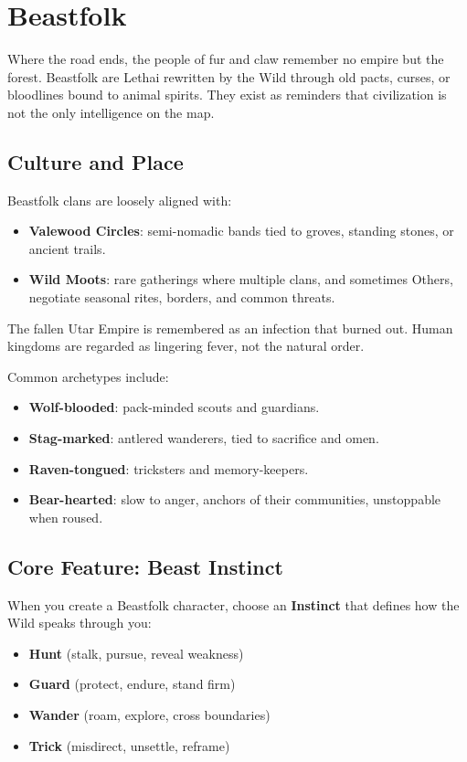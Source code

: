 \documentclass[11pt]{book}
\begin{document}
\section{Beastfolk}
\label{sec:beastfolk}

Where the road ends, the people of fur and claw remember no empire but the forest. Beastfolk are Lethai rewritten by the Wild through old pacts, curses, or bloodlines bound to animal spirits. They exist as reminders that civilization is not the only intelligence on the map.

\subsection{Culture and Place}
\label{subsec:beastfolk_culture}

Beastfolk clans are loosely aligned with:
\begin{itemize}
  \item \textbf{Valewood Circles}: semi-nomadic bands tied to groves, standing stones, or ancient trails.
  \item \textbf{Wild Moots}: rare gatherings where multiple clans, and sometimes Others, negotiate seasonal rites, borders, and common threats.
\end{itemize}

The fallen Utar Empire is remembered as an infection that burned out. Human kingdoms are regarded as lingering fever, not the natural order.

Common archetypes include:
\begin{itemize}
  \item \textbf{Wolf-blooded}: pack-minded scouts and guardians.
  \item \textbf{Stag-marked}: antlered wanderers, tied to sacrifice and omen.
  \item \textbf{Raven-tongued}: tricksters and memory-keepers.
  \item \textbf{Bear-hearted}: slow to anger, anchors of their communities, unstoppable when roused.
\end{itemize}

\subsection{Core Feature: Beast Instinct}
\label{subsec:beastfolk_instinct}

When you create a Beastfolk character, choose an \textbf{Instinct} that defines how the Wild speaks through you:
\begin{itemize}
  \item \textbf{Hunt} (stalk, pursue, reveal weakness)
  \item \textbf{Guard} (protect, endure, stand firm)
  \item \textbf{Wander} (roam, explore, cross boundaries)
  \item \textbf{Trick} (misdirect, unsettle, reframe)
\end{itemize}
\end{document}
